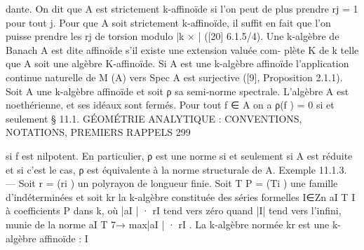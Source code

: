 \documentclass[
  10pt,
]{article}
\newenvironment{Shaded}{}{}
\newcommand{\NormalTok}[1]{#1}
\begin{document}
\begin{Shaded}
\begin{Highlighting}[]
\NormalTok{dante. On dit que A est strictement k{-}affinoïde si l’on peut de plus prendre rj = 1 pour}
\NormalTok{tout j. Pour que A soit strictement k{-}affinoïde, il suffit en fait que l’on puisse prendre}
\NormalTok{les rj de torsion modulo |k × | ([20] 6.1.5/4).}
\NormalTok{   Une k{-}algèbre de Banach A est dite affinoïde s’il existe une extension valuée com{-}}
\NormalTok{plète K de k telle que A soit une algèbre K{-}affinoïde.}
\NormalTok{   Si A est une k{-}algèbre affinoïde l’application continue naturelle de M (A) vers Spec A}
\NormalTok{est surjective ([9], Proposition 2.1.1).}
\NormalTok{   Soit A une k{-}algèbre affinoïde et soit ρ sa semi{-}norme spectrale. L’algèbre A est}
\NormalTok{noethérienne, et ses idéaux sont fermés. Pour tout f ∈ A on a ρ(f ) = 0 si et seulement}
\NormalTok{     § 11.1. GÉOMÉTRIE ANALYTIQUE : CONVENTIONS, NOTATIONS, PREMIERS RAPPELS             299}

\NormalTok{si f est nilpotent. En particulier, ρ est une norme si et seulement si A est réduite et si}
\NormalTok{c’est le cas, ρ est équivalente à la norme structurale de A.}
\NormalTok{Exemple 11.1.3. — Soit r = (ri ) un polyrayon de longueur finie. Soit T P        = (Ti ) une}
\NormalTok{famille d’indéterminées et soit kr la k{-}algèbre constituée des séries formelles I∈Zn aI T I}
\NormalTok{à coefficients}
\NormalTok{           P dans    k, où |aI | · rI tend vers zéro quand |I| tend vers l’infini, munie de}
\NormalTok{la norme      aI T 7→ max|aI | · rI . La k{-}algèbre normée kr est une k{-}algèbre affinoïde :}
\NormalTok{                  I}


\end{Highlighting}
\end{Shaded}
\end{document}
